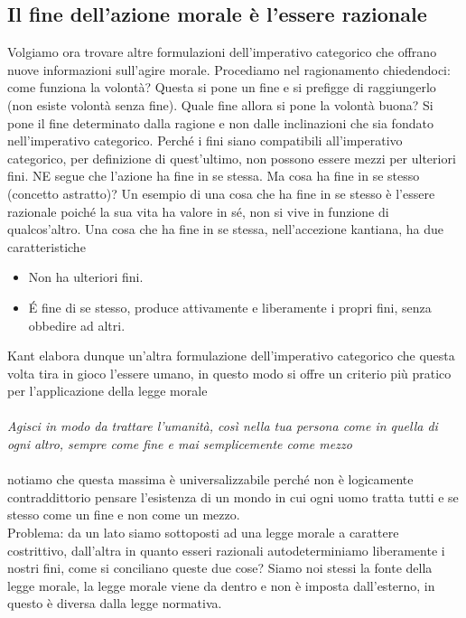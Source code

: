 \documentclass[10pt,a4paper]{article}
\begin{document}
\subsection{Il fine dell'azione morale è l'essere razionale}
Volgiamo ora trovare altre formulazioni dell'imperativo categorico che offrano nuove informazioni sull'agire morale. Procediamo nel ragionamento chiedendoci: come funziona la volontà? Questa si pone un fine e si prefigge di raggiungerlo (non esiste volontà senza fine). Quale fine allora si pone la volontà buona? Si pone il fine determinato dalla ragione e non dalle inclinazioni che sia fondato nell'imperativo categorico. Perché i fini siano compatibili all'imperativo categorico, per definizione di quest'ultimo, non possono essere mezzi per ulteriori fini. NE segue che l'azione ha fine in se stessa. Ma cosa ha fine in se stesso (concetto astratto)? Un esempio di una cosa che ha fine in se stesso è l'essere razionale poiché la sua vita ha valore in sé, non si vive in funzione di qualcos'altro. Una cosa che ha fine in se stessa, nell'accezione kantiana, ha due caratteristiche
\begin{itemize}
	\item Non ha ulteriori fini.
	\item \'E fine di se stesso, produce attivamente e liberamente i propri fini, senza obbedire ad altri.
\end{itemize}
Kant elabora dunque un'altra formulazione dell'imperativo categorico che questa volta tira in gioco l'essere umano, in questo modo si offre un criterio più pratico per l'applicazione della legge morale\\\\
\textit{Agisci in modo da trattare l'umanità, così nella tua persona come in quella di ogni altro, sempre come fine e mai semplicemente come mezzo}\\\\
notiamo che questa massima è universalizzabile perché non è logicamente contraddittorio pensare l'esistenza di un mondo in cui ogni uomo tratta tutti e se stesso come un fine e non come un mezzo.\\
Problema: da un lato siamo sottoposti ad una legge morale a carattere costrittivo, dall'altra in quanto esseri razionali autodeterminiamo liberamente i nostri fini, come si conciliano queste due cose? Siamo noi stessi la fonte della legge morale, la legge morale viene da dentro e non è imposta dall'esterno, in questo è diversa dalla legge normativa. 
\end{document}
